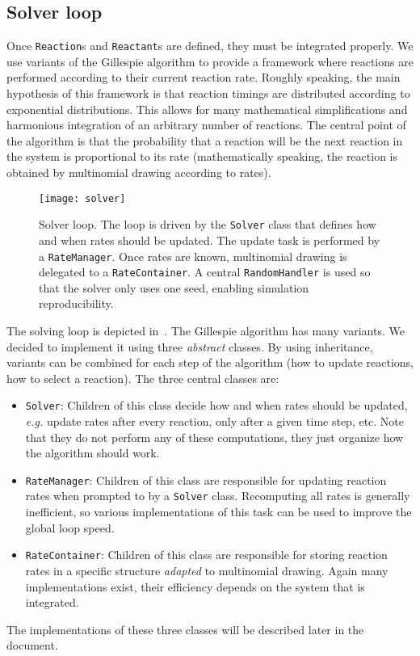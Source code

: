 
\subsection{Solver loop}

Once \texttt{Reaction}s and \texttt{Reactant}s are defined,
they must be integrated properly.
We use variants of the Gillespie algorithm to provide a framework
where reactions are performed according to their current reaction rate.
Roughly speaking, the main hypothesis of this framework is that
reaction timings are distributed according to exponential distributions.
This allows for many mathematical simplifications and harmonious integration
of an arbitrary number of reactions.
The central point of the algorithm is that the probability that a reaction
will be the next reaction in the system is proportional to its rate
(mathematically speaking, the reaction is obtained by multinomial drawing according to rates).

\begin{figure}[!h]
  \centering
  \texttt{[image: solver]}
  \caption{Solver loop.
  The loop is driven by the \texttt{Solver} class that defines
  how and when rates should be updated.
  The update task is performed by a \texttt{RateManager}.
  Once rates are known, multinomial drawing is delegated to a \texttt{RateContainer}.
  A central \texttt{RandomHandler} is used so that the solver only uses one seed,
  enabling simulation reproducibility.}
\label{fig:solver}
\end{figure}

The solving loop is depicted in~.
The Gillespie algorithm has many variants.
We decided to implement it using three \emph{abstract} classes.
By using inheritance, variants can be combined for each step of the algorithm
(how to update reactions, how to select a reaction).
The three central classes are:
\begin{itemize}
  \item \texttt{Solver}:
  Children of this class decide how and when rates should be updated,
  \textit{e.g.} update rates after every reaction, only after a given time step, etc.
  Note that they do not perform any of these computations,
  they just organize how the algorithm should work.
  \item \texttt{RateManager}:
  Children of this class are responsible for updating reaction rates
  when prompted to by a \texttt{Solver} class.
  Recomputing all rates is generally inefficient,
  so various implementations of this task can be used to improve the global loop speed.
  \item \texttt{RateContainer}: Children of this class are responsible for storing reaction rates
  in a specific structure \emph{adapted} to multinomial drawing.
  Again many implementations exist, their efficiency depends on the system that is integrated.
\end{itemize}
The implementations of these three classes will be described later in the document.
